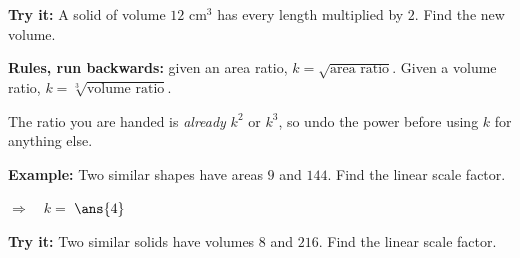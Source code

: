 \documentclass[12pt]{article}
\begin{document}
\begin{tryitbox}
\textbf{Try it:} \quad A solid of volume $12$ cm$^3$ has every length multiplied by $2$. Find the new volume.\\[2pt]
\end{tryitbox}


\begin{formulabox}
\textbf{Rules, run backwards:} given an area ratio, $k = \sqrt{\text{area ratio}}$. Given a volume ratio, $k = \sqrt[3]{\text{volume ratio}}$.\par
The ratio you are handed is \emph{already} $k^2$ or $k^3$, so undo the power before using $k$ for anything else.
\end{formulabox}

\begin{examplebox}
\textbf{Example:} \quad Two similar shapes have areas $9$ and $144$. Find the linear scale factor.

$\Rightarrow\quad k = $ $\ans{4}$
\end{examplebox}

\begin{tryitbox}
\textbf{Try it:} \quad Two similar solids have volumes $8$ and $216$. Find the linear scale factor.\\[2pt]
\end{tryitbox}
\end{document}
